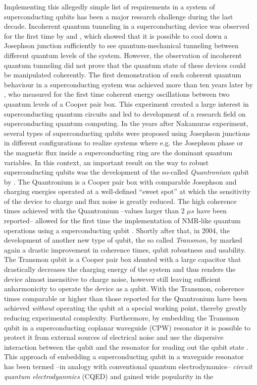 Implementing this allegedly simple list of requirements in a system of superconducting qubits has been a major research challenge during the last decade. Incoherent quantum tunneling in a superconducting device was observed for the first time by \cite{devoret_measurements_1985,martinis_energy-level_1985} and \cite{clarke_quantum_1988}, which showed that it is possible to cool down a Josephson junction sufficiently to see quantum-mechanical tunneling between different quantum levels of the system. However, the observation of incoherent quantum tunneling did not prove that the quantum state of these devices could be manipulated coherently. The first demonstration of such coherent quantum behaviour in a superconducting system was achieved more than ten years later by \cite{nakamura_coherent_1999}, who measured for the first time coherent energy oscillations between two quantum levels of a Cooper pair box. This experiment created a large interest in superconducting quantum circuits and led to development of a research field on superconducting quantum computing. In the years after Nakamuras experiment, several types of superconducting qubits were proposed using Josephson junctions in different configurations to realize systems where e.g. the Josephson phase \citep{martinis_rabi_2002} or the magnetic flux inside a superconducting ring \citep{mooij_josephson_1999,chiorescu_coherent_2003} are the dominant quantum variables. In this context, an important result on the way to robust superconducting qubits was the development of the so-called {\it Quantronium} qubit by \cite{vion_manipulating_2002}. The Quantronium is a Cooper pair box with comparable Josephson and charging energies operated at a well-defined ``sweet spot'' at which the sensitivity of the device to charge and flux noise is greatly reduced. The high coherence times achieved with the Quantronium --values larger than 2 $\mu s$ have been reported-- allowed for the first time the implementation of NMR-like quantum operations using a superconducting qubit \citep{collin_nmr-like_2004}. Shortly after that, in 2004, the development of another new type of qubit, the so called {\it Transmon}, by \cite{wallraff_strong_2004} marked again a drastic improvement in coherence times, qubit robustness and usability. The Transmon qubit is a Cooper pair box shunted with a large capacitor that drastically decreases the charging energy of the system and thus renders the device almost insensitive to charge noise, however still leaving sufficient anharmonicity to operate the device as a qubit. With the Transmon, coherence times comparable or higher than those reported for the Quantronium have been achieved {\it without} operating the qubit at a special working point, thereby greatly reducing experimental complexity. Furthermore, by embedding the Transmon qubit in a superconducting coplanar waveguide (CPW) resonator it is possible to protect it from external sources of electrical noise and use the dispersive interaction between the qubit and the resonator for reading out the qubit state \citep{blais_cavity_2004}. This approach of embedding a superconducting qubit in a waveguide resonator has been termed --in analogy with conventional quantum electrodynamics-- {\it circuit quantum electrodyanmics} (CQED) and gained wide popularity in the 